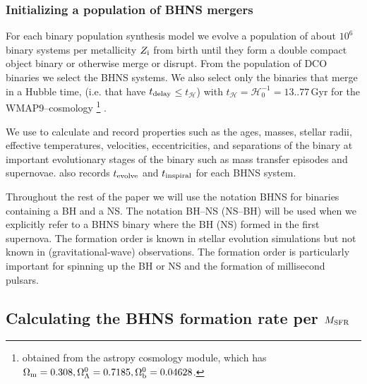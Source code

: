 \documentclass[twocolumn]{aastex63}
\newcommand\COMPAS{{\sc{COMPAS }}}
\newcommand\bhnsSingle{BHNS\xspace}
\newcommand{\Zi}{\ensuremath{Z_{\rm{i}}}\xspace}
\newcommand{\tdelay}{\ensuremath{{t}_{\rm{delay}}}\xspace}
\newcommand{\tevolve}{\ensuremath{{t}_{\rm{evolve}}}\xspace}
\newcommand{\tinspiral}{\ensuremath{{t}_{\rm{inspiral}}}\xspace}
\begin{document}
\subsubsection{Initializing a population of \bhnsSingle mergers}
\label{subsec:selecting-a-population-of-BHNS-mergers}
%
%
For each binary population synthesis model  we evolve a population of about  $10^6$ binary systems per metallicity $\Zi$ from birth until they form a double compact object binary or otherwise merge or disrupt. From the population of \ac{DCO} binaries we select the \bhnsSingle systems. We also select only the binaries that merge in a Hubble time, (i.e. that have \tdelay $\leq t_{\mathcal{H}}$) with $t_{\mathcal{H}} =  \mathcal{H}_0^{-1} = 13..77$\,Gyr \citep{2016A&A...594A..13P}  for the WMAP9--cosmology \citep{2013ApJS..208...19H}\footnote{obtained from the astropy cosmology module, which has  $\Omega_{\rm{m}}=0.308, \Omega_{\Lambda}^0= 0.7185, \Omega^0_{\rm{b}}=0.04628$.} . 

We use {\COMPAS} to calculate and record properties such as the ages, masses, stellar radii, effective temperatures, velocities, eccentricities,  and separations of the binary at important evolutionary stages of the binary such as mass transfer episodes and supernovae. \COMPAS also records \tevolve and \tinspiral for each \bhnsSingle system. 





Throughout the rest of the paper we will use the notation \bhnsSingle for binaries containing a \ac{BH} and a NS. The notation BH--NS  (NS--BH) will be used when we explicitly refer to a \bhnsSingle binary where the \ac{BH} (NS) formed in the first supernova. The formation order is known in stellar evolution simulations but  not known in (gravitational-wave) observations.  The formation order is particularly important for spinning up the \ac{BH} or \ac{NS} and the formation of millisecond pulsars. 




\subsection{Calculating the \bhnsSingle formation rate per $M_{\rm{SFR}}$}
\label{subsec:method-BPS-merger-rate-per-M-SFR}
%
\end{document}
